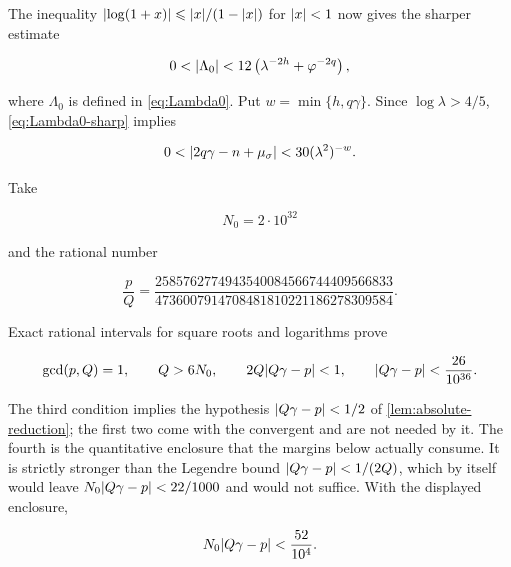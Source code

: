 The inequality $\lvert\log(1+x)\rvert\leqslant\lvert x\rvert/(1-\lvert x\rvert)$ for
$\lvert x\rvert<1$ now gives the sharper estimate

\begin{equation}
 0<\lvert\Lambda_0\rvert
 <12\left(\lambda^{-2h}+\varphi^{-2q}\right),
 \label{eq:Lambda0-sharp}
\end{equation}

where $\Lambda_0$ is defined in \cref{eq:Lambda0}. Put
$w=\min\{h,q\gamma\}$. Since $\log\lambda>4/5$,
\cref{eq:Lambda0-sharp} implies

\begin{equation}
 0<\lvert2q\gamma-n+\mu_\sigma\rvert
 <30(\lambda^2)^{-w}.
 \label{eq:fixed-reduction-form}
\end{equation}

Take

\begin{equation}
 N_0=2\mathbin{\cdot}10^{32}
 \label{eq:N0}
\end{equation}

and the rational number

\begin{equation}
 \frac pQ
 =\frac{2585762774943540084566744409566833}
 {4736007914708481810221186278309584}.
 \label{eq:common-convergent}
\end{equation}

Exact rational intervals for square roots and logarithms prove

\begin{equation}
 \gcd(p,Q)=1,
 \qquad
 Q>6N_0,
 \qquad
 2Q\lvert Q\gamma-p\rvert<1,
 \qquad
 \lvert Q\gamma-p\rvert<\frac{26}{10^{36}}.
 \label{eq:convergent-enclosure}
\end{equation}

The third condition implies the hypothesis $\lvert Q\gamma-p\rvert<1/2$ of
\cref{lem:absolute-reduction}; the first two come with the convergent and
are not needed by it. The fourth is the quantitative enclosure that
the margins below actually consume. It is strictly stronger than the
Legendre bound $\lvert Q\gamma-p\rvert<1/(2Q)$, which by itself would leave
$N_0\lvert Q\gamma-p\rvert<22/1000$ and would not suffice. With the displayed
enclosure,

\begin{equation}
 N_0\lvert Q\gamma-p\rvert<\frac{52}{10^4}.
 \label{eq:convergent-error-scaled}
\end{equation}

